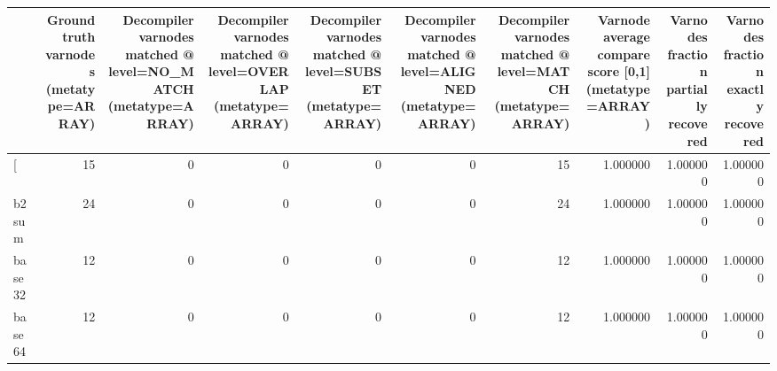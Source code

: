 \begin{tabular}{lrrrrrrrrr}
\toprule
{} &  Ground truth varnodes (metatype=ARRAY) &  Decompiler varnodes matched @ level=NO\_MATCH (metatype=ARRAY) &  Decompiler varnodes matched @ level=OVERLAP (metatype=ARRAY) &  Decompiler varnodes matched @ level=SUBSET (metatype=ARRAY) &  Decompiler varnodes matched @ level=ALIGNED (metatype=ARRAY) &  Decompiler varnodes matched @ level=MATCH (metatype=ARRAY) &  Varnode average compare score [0,1] (metatype=ARRAY) &  Varnodes fraction partially recovered &  Varnodes fraction exactly recovered \\
\midrule
[         &                                      15 &                                                  0 &                                                  0 &                                                  0 &                                                  0 &                                                 15 &                                           1.000000 &                               1.000000 &                             1.000000 \\
b2sum     &                                      24 &                                                  0 &                                                  0 &                                                  0 &                                                  0 &                                                 24 &                                           1.000000 &                               1.000000 &                             1.000000 \\
base32    &                                      12 &                                                  0 &                                                  0 &                                                  0 &                                                  0 &                                                 12 &                                           1.000000 &                               1.000000 &                             1.000000 \\
base64    &                                      12 &                                                  0 &                                                  0 &                                                  0 &                                                  0 &                                                 12 &                                           1.000000 &                               1.000000 &                             1.000000 \\

\end{tabular}
